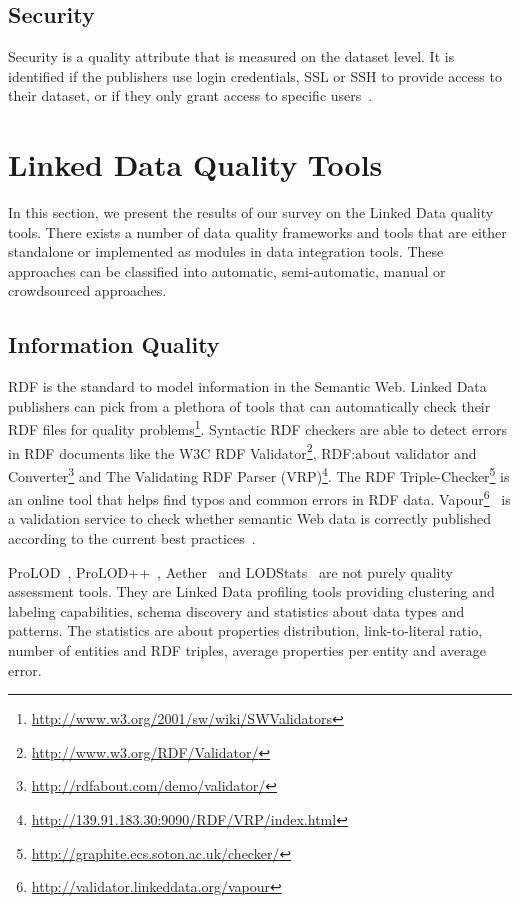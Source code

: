 \subsection{Security}
Security is a quality attribute that is measured on the dataset level. It is identified if the publishers use login credentials, SSL or SSH to provide access to their dataset, or if they only grant access to specific users~\cite{Zaveri:SemWebJorunal:12}.


\section{Linked Data Quality Tools}
\label{section:quality-tools}

In this section, we present the results of our survey on the Linked Data quality tools. There exists a number of data quality frameworks and tools that are either standalone or implemented as modules in data integration tools. These approaches can be classified into automatic, semi-automatic, manual or crowdsourced approaches.

\subsection{Information Quality}
RDF is the standard to model information in the Semantic Web. Linked Data publishers can pick from a plethora of tools that can automatically check their RDF files for quality problems\footnote{\url{http://www.w3.org/2001/sw/wiki/SWValidators}}. Syntactic RDF checkers are able to detect errors in RDF documents like the W3C RDF Validator\footnote{\url{http://www.w3.org/RDF/Validator/}}, RDF:about validator and Converter\footnote{\url{http://rdfabout.com/demo/validator/}} and The Validating RDF Parser (VRP)\footnote{\url{http://139.91.183.30:9090/RDF/VRP/index.html}}. The RDF Triple-Checker\footnote{\url{http://graphite.ecs.soton.ac.uk/checker/}} is an online tool that helps find typos and common errors in RDF data. Vapour\footnote{\url{http://validator.linkeddata.org/vapour}}~\cite{Berrueta:SFSW:08} is a validation service to check whether semantic Web data is correctly published according to the current best practices~\cite{Berners-Lee:W3C:06}.

ProLOD~\cite{Bohm:ICDEW:10}, ProLOD++~\cite{Abedjan:ICDE:14}, Aether~\cite{Makela:ESWC:14} and LODStats~\cite{Auer:EKAW:12} are not purely quality assessment tools. They are Linked Data profiling tools providing clustering and labeling capabilities, schema discovery and statistics about data types and patterns. The statistics are about properties distribution, link-to-literal ratio, number of entities and RDF triples, average properties per entity and average error.

